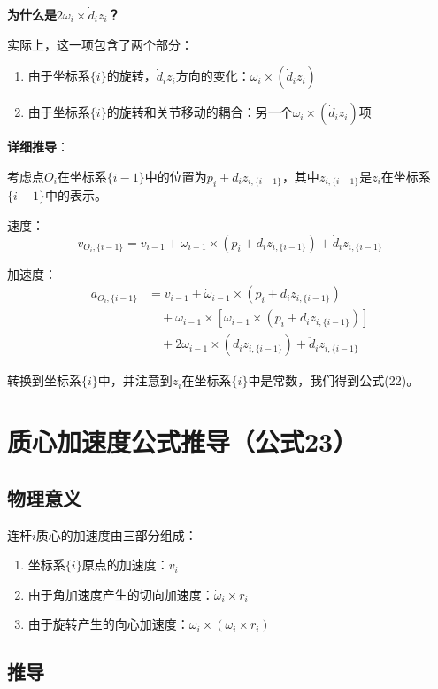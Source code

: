 \documentclass[12pt,a4paper]{article}
\begin{document}
\textbf{为什么是$2\omega_i \times \dot{d}_i z_i$？}

实际上，这一项包含了两个部分：
\begin{enumerate}
\item 由于坐标系$\{i\}$的旋转，$\dot{d}_i z_i$方向的变化：$\omega_i \times (\dot{d}_i z_i)$
\item 由于坐标系$\{i\}$的旋转和关节移动的耦合：另一个$\omega_i \times (\dot{d}_i z_i)$项
\end{enumerate}

\textbf{详细推导}：

考虑点$O_i$在坐标系$\{i-1\}$中的位置为$p_i + d_i z_{i,\{i-1\}}$，其中$z_{i,\{i-1\}}$是$z_i$在坐标系$\{i-1\}$中的表示。

速度：
\begin{equation}
v_{O_i, \{i-1\}} = v_{i-1} + \omega_{i-1} \times (p_i + d_i z_{i,\{i-1\}}) + \dot{d}_i z_{i,\{i-1\}}
\end{equation}

加速度：
\begin{align}
a_{O_i, \{i-1\}} &= \dot{v}_{i-1} + \dot{\omega}_{i-1} \times (p_i + d_i z_{i,\{i-1\}}) \\
&\quad + \omega_{i-1} \times [\omega_{i-1} \times (p_i + d_i z_{i,\{i-1\}})] \\
&\quad + 2\omega_{i-1} \times (\dot{d}_i z_{i,\{i-1\}}) + \ddot{d}_i z_{i,\{i-1\}}
\end{align}

转换到坐标系$\{i\}$中，并注意到$z_i$在坐标系$\{i\}$中是常数，我们得到公式(22)。

\section{质心加速度公式推导（公式23）}

\subsection{物理意义}

连杆$i$质心的加速度由三部分组成：
\begin{enumerate}
\item 坐标系$\{i\}$原点的加速度：$\dot{v}_i$
\item 由于角加速度产生的切向加速度：$\dot{\omega}_i \times r_i$
\item 由于旋转产生的向心加速度：$\omega_i \times (\omega_i \times r_i)$
\end{enumerate}

\subsection{推导}
\end{document}
